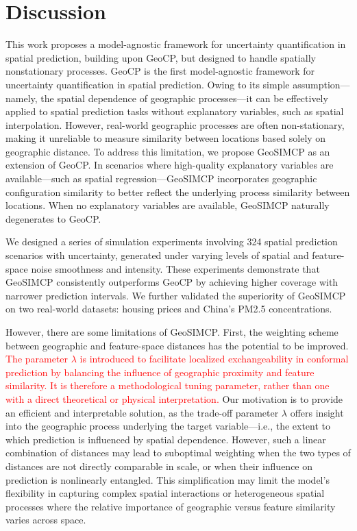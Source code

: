 \documentclass[authoryear,preprint,review,12pt]{elsarticle}
\begin{document}
\section{Discussion}

This work proposes a model-agnostic framework for uncertainty quantification in spatial prediction, building upon GeoCP, but designed to handle spatially nonstationary processes. GeoCP is the first model-agnostic framework for uncertainty quantification in spatial prediction. Owing to its simple assumption—namely, the spatial dependence of geographic processes—it can be effectively applied to spatial prediction tasks without explanatory variables, such as spatial interpolation. However, real-world geographic processes are often non-stationary, making it unreliable to measure similarity between locations based solely on geographic distance. To address this limitation, we propose GeoSIMCP as an extension of GeoCP. In scenarios where high-quality explanatory variables are available—such as spatial regression—GeoSIMCP incorporates geographic configuration similarity to better reflect the underlying process similarity between locations. When no explanatory variables are available, GeoSIMCP naturally degenerates to GeoCP.

We designed a series of simulation experiments involving 324 spatial prediction scenarios with uncertainty, generated under varying levels of spatial and feature-space noise smoothness and intensity. These experiments demonstrate that GeoSIMCP consistently outperforms GeoCP by achieving higher coverage with narrower prediction intervals. We further validated the superiority of GeoSIMCP on two real-world datasets: housing prices and China’s PM2.5 concentrations.


However, there are some limitations of GeoSIMCP. First, the weighting scheme between geographic and feature-space distances has the potential to be improved. \textcolor{red}{The parameter $\lambda$ is introduced to facilitate localized exchangeability in conformal prediction by balancing the influence of geographic proximity and feature similarity. It is therefore a methodological tuning parameter, rather than one with a direct theoretical or physical interpretation.} Our motivation is to provide an efficient and interpretable solution, as the trade-off parameter $\lambda$ offers insight into the geographic process underlying the target variable—i.e., the extent to which prediction is influenced by spatial dependence. However, such a linear combination of distances may lead to suboptimal weighting when the two types of distances are not directly comparable in scale, or when their influence on prediction is nonlinearly entangled. This simplification may limit the model’s flexibility in capturing complex spatial interactions or heterogeneous spatial processes where the relative importance of geographic versus feature similarity varies across space.
\end{document}
